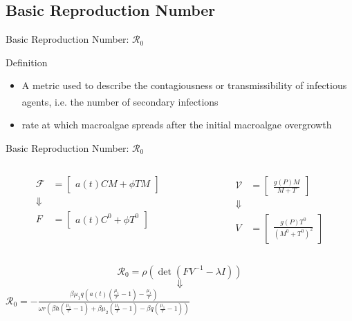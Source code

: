 \documentclass{beamer}
\begin{document}
\subsection{Basic Reproduction Number}
\begin{frame}{Basic Reproduction Number: $\mathscr{R}_{0}$}
    \begin{block}{Definition}
        \begin{itemize}
            \item A metric used to describe the contagiousness or transmissibility of infectious agents\textsuperscript{\cite{delamater_street_leslie_yang_jacobsen_2019}}, i.e. the number of secondary infections
            \item rate at which macroalgae spreads after the initial macroalgae overgrowth
        \end{itemize}
        
    \end{block}
\end{frame}

\begin{frame}{Basic Reproduction Number: $\mathscr{R}_{0}$}
    \begin{columns}
        \begin{column}{0.5\textwidth}
            \begin{align*}
                \mathscr{F} &= \begin{bmatrix} a(t)CM+\phi TM \end{bmatrix}\\
                \Downarrow\\
                F &= \begin{bmatrix} a(t)C^{0} + \phi T^{0} \end{bmatrix}
            \end{align*}
        \end{column}
        \begin{column}{0.5\textwidth}
            \begin{align*}
                \mathscr{V} &= \begin{bmatrix} \frac{g(P)M}{M+T} \end{bmatrix}\\
                \Downarrow\\
                V &= \begin{bmatrix} \frac{g(P)T^{0}}{(M^{0}+T^{0})^{2}} \end{bmatrix}
            \end{align*}
        \end{column}
    \end{columns}
    $$\mathscr{R}_{0} = \rho(\det(FV^{-1} - \lambda I))$$
    $$\Downarrow$$
    \centering
    $\displaystyle {\mathscr{R}}_{0} = - \frac{\beta \mu_{1}q(a(t)(\frac{\mu_{1}}{r}-1)-\frac{\mu_{1}}{r})}{\omega r (\beta h (\frac{\mu_{1}}{r}-1) + \beta \mu_{2} (\frac{\mu_{1}}{r}-1) - \beta q(\frac{\mu_{1}}{r}-1))}$
\end{frame}
\end{document}
